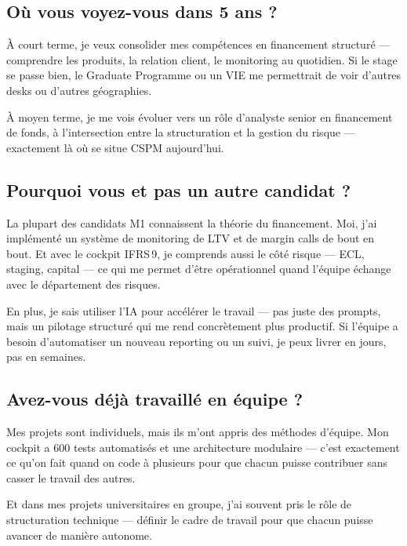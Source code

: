 \documentclass[11pt,a4paper]{article}
\begin{document}
\subsection{\og O\`u vous voyez-vous dans 5 ans ? \fg{}}

\begin{verbatimbox}
\og \`A court terme, je veux consolider mes comp\'etences en financement
structur\'e --- comprendre les produits, la relation client, le monitoring
au quotidien. Si le stage se passe bien, le Graduate Programme ou un VIE
me permettrait de voir d'autres desks ou d'autres g\'eographies.

\`A moyen terme, je me vois \'evoluer vers un r\^ole d'analyste senior
en financement de fonds, \`a l'intersection entre la structuration et
la gestion du risque --- exactement l\`a o\`u se situe CSPM aujourd'hui. \fg{}
\end{verbatimbox}

\subsection{\og Pourquoi vous et pas un autre candidat ? \fg{}}

\begin{verbatimbox}
\og La plupart des candidats M1 connaissent la th\'eorie du financement.
Moi, j'ai impl\'ement\'e un syst\`eme de monitoring de LTV et de margin
calls de bout en bout. Et avec le cockpit IFRS\,9, je comprends aussi
le c\^ot\'e risque --- ECL, staging, capital --- ce qui me permet d'\^etre
op\'erationnel quand l'\'equipe \'echange avec le d\'epartement des risques.

En plus, je sais utiliser l'IA pour acc\'el\'erer le travail --- pas
juste des prompts, mais un pilotage structur\'e qui me rend concr\`etement
plus productif. Si l'\'equipe a besoin d'automatiser un nouveau reporting
ou un suivi, je peux livrer en jours, pas en semaines. \fg{}
\end{verbatimbox}

\subsection{\og Avez-vous d\'ej\`a travaill\'e en \'equipe ? \fg{}}

\begin{verbatimbox}
\og Mes projets sont individuels, mais ils m'ont appris des m\'ethodes
d'\'equipe. Mon cockpit a 600 tests automatis\'es et une architecture
modulaire --- c'est exactement ce qu'on fait quand on code \`a plusieurs
pour que chacun puisse contribuer sans casser le travail des autres.

Et dans mes projets universitaires en groupe, j'ai souvent pris le
r\^ole de structuration technique --- d\'efinir le cadre de travail
pour que chacun puisse avancer de mani\`ere autonome. \fg{}
\end{verbatimbox}
\end{document}
